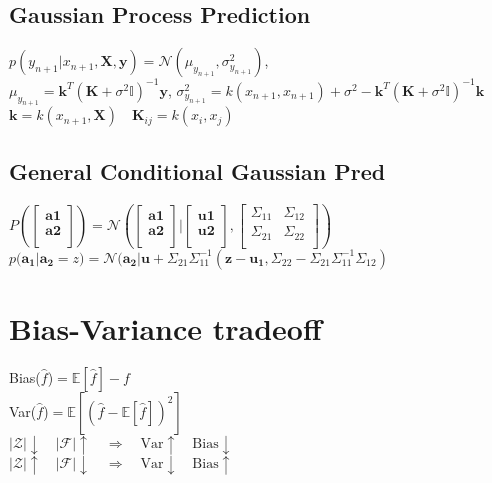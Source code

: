 \subsection*{Gaussian Process Prediction}
$p(y_{n+1}|x_{n+1},\mathbf{X},\mathbf{y}) = \mathcal{N}(\mu_{y_{n+1}},\sigma^2_{y_{n+1}})$,\\
$\mu_{y_{n+1}}=\mathbf{k}^T(\mathbf{K}+\sigma^2\mathbb{I})^{-1}\mathbf{y}$,
$\sigma^2_{y_{n+1}}=k(x_{n+1},x_{n+1}){+}\sigma^2-\mathbf{k}^T(\mathbf{K}+\sigma^2\mathbb{I})^{-1}\mathbf{k}$\\
$\mathbf{k}=k(x_{n+1},\mathbf{X})\quad \mathbf{K}_{ij}=k(x_i,x_j)$\\
\subsection*{General Conditional Gaussian Pred}
$P(\begin{bmatrix}
\mathbf{a1}\\
\mathbf{a2}\\
\end{bmatrix}){=}\mathcal{N}(\begin{bmatrix}
\mathbf{a1}\\
\mathbf{a2}\\
\end{bmatrix}|\begin{bmatrix}
\mathbf{u1}\\
\mathbf{u2}\\
\end{bmatrix},\begin{bmatrix}
\Sigma_{11} & \Sigma_{12} \\
\Sigma_{21} & \Sigma_{22}\\
\end{bmatrix})$\\
 $p(\mathbf{a_1}|\mathbf{a_2} = z) = \mathcal{N}(\mathbf{a_2}|\mathbf{u}+\Sigma_{21} \Sigma_{11}^{-1}(\mathbf{z}-\mathbf{u_1}, \Sigma_{22}- \Sigma_{21} \Sigma_{11}^{-1} \Sigma_{12})$
\fi
\section*{Bias-Variance tradeoff}
Bias($\hat{f}$)$=\mathbb{E}[\hat{f}]-f$\\
Var($\hat{f}$)$=\mathbb{E}[(\hat{f}-\mathbb{E}[\hat{f}])^2]$\\
$|\mathcal{Z}|\downarrow \quad|\mathcal{F}|\uparrow\quad\Rightarrow\quad\mathrm{Var}\uparrow\quad\mathrm{Bias}\downarrow $\\
$|\mathcal{Z}|\uparrow \quad|\mathcal{F}|\downarrow\quad\Rightarrow\quad\mathrm{Var}\downarrow\quad\mathrm{Bias}\uparrow $

